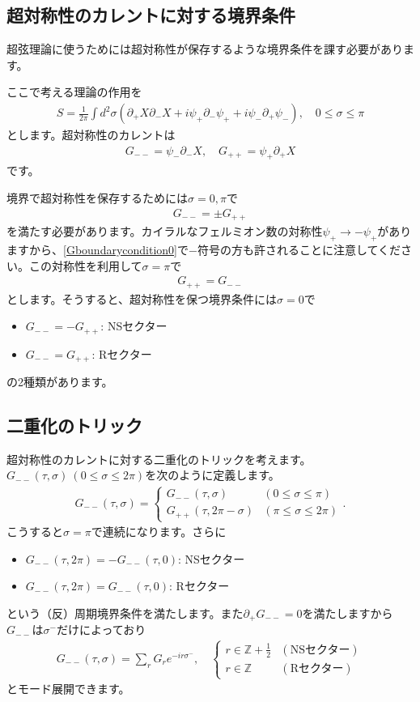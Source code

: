 \documentclass[report,paper=a4, fontsize=12pt, line_length=16cm, number_of_lines=34,dvipdfmx]{jlreq}
\numberwithin{equation}{chapter}
\numberwithin{equation}{section}
\newcommand{\Zb}{\mathbb{Z}}
\newcommand{\del}{\partial}
\newcommand{\Zbh}{\Zb+\frac12}
\begin{document}
\subsection{超対称性のカレントに対する境界条件}
超弦理論に使うためには超対称性が保存するような境界条件を課す必要があります。

ここで考える理論の作用を
\begin{align}
  S=\frac{1}{2\pi}\int d^2\sigma \left( 
    \del_{+}X \del_{-} X+i\psi_{+}\del_{-}\psi_{+}+i\psi_{-}\del_{+}\psi_{-}
   \right),\quad 0\le \sigma \le \pi
\end{align}
とします。超対称性のカレントは
\begin{align}
  G_{--}=\psi_{-}\del_{-}X  
  ,\quad
  G_{++}=\psi_{+}\del_{+}X
\end{align}
です。

境界で超対称性を保存するためには$\sigma=0,\pi$で
\begin{align}
  G_{--}=\pm G_{++}\label{Gboundarycondition0}
\end{align}
を満たす必要があります。カイラルなフェルミオン数の対称性$\psi_{+}\to -\psi_{+}$がありますから、\eqref{Gboundarycondition0}で$-$符号の方も許されることに注意してください。この対称性を利用して$\sigma=\pi$で
\begin{align}
  G_{++}=G_{--}
\end{align}
とします。そうすると、超対称性を保つ境界条件には$\sigma=0$で
\begin{itemize}
  \item $G_{--}=-G_{++}$: NSセクター
  \item $G_{--}=G_{++}$: Rセクター
\end{itemize}
の2種類があります。

\subsection{二重化のトリック}
超対称性のカレントに対する二重化のトリックを考えます。$G_{--}(\tau,\sigma)\ (0\le \sigma \le 2\pi)$を次のように定義します。
\begin{align}
  G_{--}(\tau,\sigma)
  =
  \begin{cases}
    G_{--}(\tau,\sigma) & (0\le \sigma \le \pi)\\
    G_{++}(\tau,2\pi-\sigma) & (\pi\le \sigma \le 2\pi)
  \end{cases}.
\end{align}
こうすると$\sigma=\pi$で連続になります。さらに
\begin{itemize}
  \item $G_{--}(\tau,2\pi)=-G_{--}(\tau,0)$: NSセクター
  \item $G_{--}(\tau,2\pi)=G_{--}(\tau,0)$: Rセクター
\end{itemize}
という（反）周期境界条件を満たします。また$\del_{+}G_{--}=0$を満たしますから$G_{--}$は$\sigma^{-}$だけによっており
\begin{align}
  G_{--}(\tau,\sigma)=\sum_{r}G_{r}e^{-ir\sigma^{-}},\quad
  \begin{cases}
    r\in \Zbh & (\text{NSセクター})\\
    r\in \Zb & (\text{Rセクター})
  \end{cases}
\end{align}
とモード展開できます。
\end{document}
